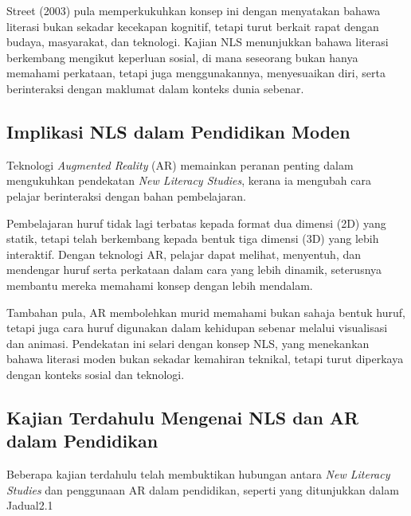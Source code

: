\hspace{1cm}Street (2003) pula memperkukuhkan konsep ini dengan menyatakan bahawa literasi bukan sekadar kecekapan kognitif, tetapi turut berkait rapat dengan budaya, masyarakat, dan teknologi. Kajian NLS menunjukkan bahawa literasi berkembang mengikut keperluan sosial, di mana seseorang bukan hanya memahami perkataan, tetapi juga menggunakannya, menyesuaikan diri, serta berinteraksi dengan maklumat dalam konteks dunia sebenar.

\subsection{{Implikasi NLS dalam Pendidikan Moden}}
Teknologi \textit{Augmented Reality} (AR) memainkan peranan penting dalam mengukuhkan pendekatan\textit{ New Literacy Studies}, kerana ia mengubah cara pelajar berinteraksi dengan bahan pembelajaran.

Pembelajaran huruf tidak lagi terbatas kepada format dua dimensi (2D) yang statik, tetapi telah berkembang kepada bentuk tiga dimensi (3D) yang lebih interaktif. Dengan teknologi AR, pelajar dapat melihat, menyentuh, dan mendengar huruf serta perkataan dalam cara yang lebih dinamik, seterusnya membantu mereka memahami konsep dengan lebih mendalam.

Tambahan pula, AR membolehkan murid memahami bukan sahaja bentuk huruf, tetapi juga cara huruf digunakan dalam kehidupan sebenar melalui visualisasi dan animasi. Pendekatan ini selari dengan konsep NLS, yang menekankan bahawa literasi moden bukan sekadar kemahiran teknikal, tetapi turut diperkaya dengan konteks sosial dan teknologi.



\subsection{Kajian Terdahulu Mengenai NLS dan AR dalam Pendidikan}
Beberapa kajian terdahulu telah membuktikan hubungan antara \textit{New Literacy Studies }dan penggunaan AR dalam pendidikan, seperti yang ditunjukkan dalam Jadual2.1



